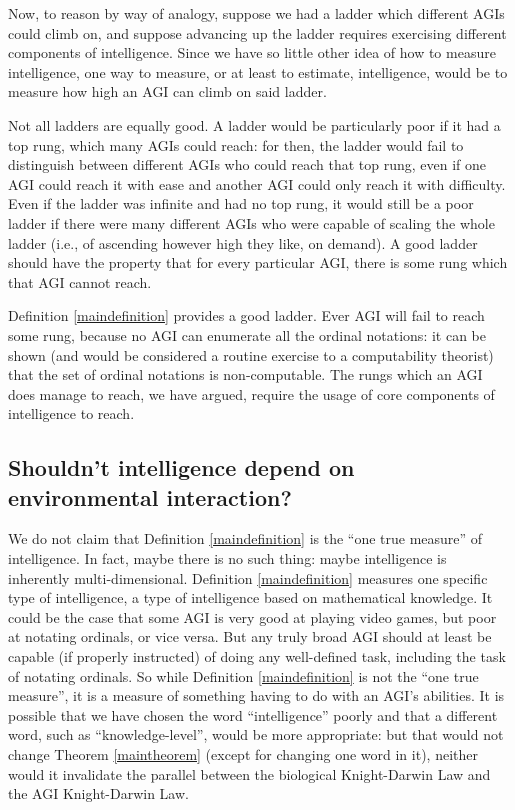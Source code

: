 \documentclass[runningheads]{llncs}
\begin{document}
Now, to reason by way of analogy, suppose we had a ladder which different AGIs
could climb on, and suppose advancing up the ladder requires exercising different
components of intelligence. Since we have so little other idea of how to measure
intelligence, one way to measure, or at least to estimate, intelligence, would be
to measure how high an AGI can climb on said ladder.

Not all ladders are equally good. A ladder would be particularly poor if it had
a top rung, which many AGIs could reach: for then, the ladder would fail to
distinguish between different AGIs who could reach that top rung, even if one
AGI could reach it with ease and another AGI could only reach it with difficulty.
Even if the ladder was infinite and had no top rung, it would still be a poor
ladder if there were many different AGIs who were capable of scaling the whole
ladder (i.e., of ascending however high they like, on demand). A good ladder
should have the property that for every particular AGI, there is some rung which
that AGI cannot reach.

Definition \ref{maindefinition} provides a good ladder. Ever AGI will fail to
reach some rung, because no AGI can enumerate all the ordinal notations: it can
be shown (and would be considered a routine exercise to a computability theorist)
that the set of ordinal notations is non-computable. The rungs which an AGI does
manage to reach, we have argued, require the usage of core components of intelligence
to reach.

\subsection{Shouldn't intelligence depend on environmental interaction?}

We do not claim that Definition \ref{maindefinition} is the ``one true measure'' of
intelligence. In fact, maybe there is no such thing: maybe intelligence is inherently
multi-dimensional. Definition \ref{maindefinition} measures one specific type of
intelligence, a type of intelligence based on mathematical knowledge. It could be the
case that some AGI is very good at playing video games, but poor at notating ordinals,
or vice versa. But any truly broad AGI should at least be capable (if properly
instructed) of doing any well-defined task, including the task of notating ordinals.
So while Definition \ref{maindefinition} is not the ``one true measure'', it is a
measure of something having to do with an AGI's abilities. It is possible that we
have chosen the word ``intelligence'' poorly and that a different word, such as
``knowledge-level'', would be more appropriate: but that would not change
Theorem \ref{maintheorem} (except for changing one word in it), neither would it
invalidate the parallel between the biological Knight-Darwin Law and the
AGI Knight-Darwin Law.
\end{document}
